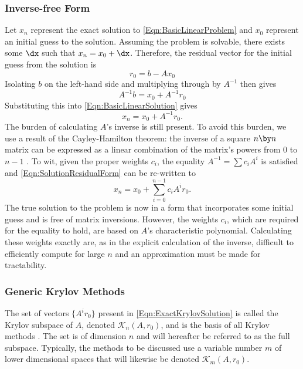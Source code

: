 \subsubsection{Inverse-free Form}
Let $x_n$ represent the exact solution to \cref{Eqn:BasicLinearProblem} and $x_0$ represent an initial guess to the solution.
Assuming the problem is solvable, there exists some $\dx$ such that $x_n = x_0 + \dx$.
Therefore, the residual vector for the initial guess from the solution is
\begin{equation}
    r_0 = b - A x_0
    \label{Eqn:InitialResidual}
\end{equation}
Isolating $b$ on the left-hand side and multiplying through by $A^{-1}$ then gives
\begin{equation}
    A^{-1} b = x_0 + A^{-1} r_0
\end{equation}
Substituting this into \cref{Eqn:BasicLinearSolution} gives
\begin{equation}
    x_n = x_0 + A^{-1} r_0.
    \label{Eqn:SolutionResidualForm}
\end{equation}
The burden of calculating $A$'s inverse is still present.
To avoid this burden, we use a result of the Cayley-Hamilton theorem: the inverse of a square $n \by n$ matrix can be expressed as a linear combination of the matrix's powers from $0$ to $n-1$ \cite{rao_mathematical_2009}.
To wit, given the proper weights $c_i$, the equality $A^{-1} = \sum c_i A^i$ is satisfied and \cref{Eqn:SolutionResidualForm} can be re-written to
\begin{equation}
    x_n = x_0 + \sum_{i = 0}^{n-1} c_i A^i r_0.
    \label{Eqn:ExactKrylovSolution}
\end{equation}
The true solution to the problem is now in a form that incorporates some initial guess and is free of matrix inversions.
However, the weights $c_i$, which are required for the equality to hold, are based on $A$'s characteristic polynomial.
Calculating these weights exactly are, as in the explicit calculation of the inverse, difficult to efficiently compute for large $n$ and an approximation must be made for tractability.




\subsubsection{Generic Krylov Methods}
The set of vectors $\{A^i r_0\}$ present in \cref{Eqn:ExactKrylovSolution} is called the Krylov subspace of $A$, denoted $\mathcal{K}_n(A,r_0)$, and is the basis of all Krylov methods \cite{saad_iterative_2003}.
The set is of dimension $n$ and will hereafter be referred to as the full subspace.
Typically, the methods to be discussed use a variable number $m$ of lower dimensional spaces that will likewise be denoted $\mathcal{K}_m(A,r_0)$.

